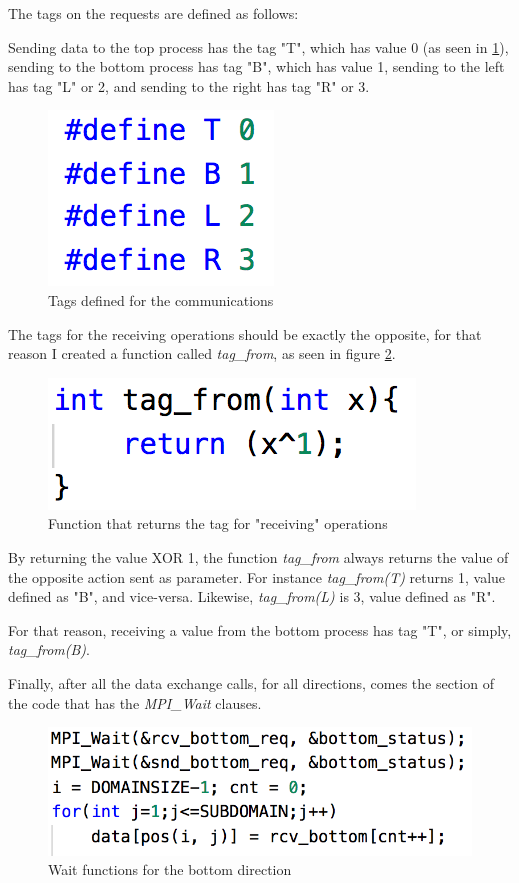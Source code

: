 \documentclass[unicode,11pt,a4paper,oneside,numbers=endperiod,openany]{scrartcl}
\begin{document}
\begin{itemize}
        The tags on the requests are defined as follows:

        Sending data to the top process has the tag "T", which has value 0 (as seen in \ref{tags}), sending to the bottom process has tag "B", which has value 1, sending to the left has tag "L" or 2, and sending to the right has tag "R" or 3.
\begin{figure}[H]
    \centering
    \includegraphics[width=0.2\linewidth]{tags}
    \caption{Tags defined for the communications}
    \label{tags}
\end{figure}

    The tags for the receiving operations should be exactly the opposite, for that reason I created a function called \textit{tag\_from}, as seen in figure \ref{tag_from}.

\begin{figure}[H]
    \centering
    \includegraphics[width=0.4\linewidth]{tag_from}
    \caption{Function that returns the tag for "receiving" operations}
    \label{tag_from}
\end{figure}

By returning the value XOR 1, the function \textit{tag\_from} always returns the value of the opposite action sent as parameter.
For instance \textit{tag\_from(T)} returns 1, value defined as "B", and vice-versa. Likewise, \textit{tag\_from(L)} is 3, value defined as "R".

For that reason, receiving a value from the bottom process has tag "T", or simply, \textit{tag\_from(B)}.

Finally, after all the data exchange calls, for all directions, comes the section of the code that has the \textit{MPI\_Wait} clauses.

\begin{figure}[H]
    \centering
    \includegraphics[width=0.9\linewidth]{wait_bottom}
    \caption{Wait functions for the bottom direction}
\end{figure}


\end{itemize}
\end{document}
